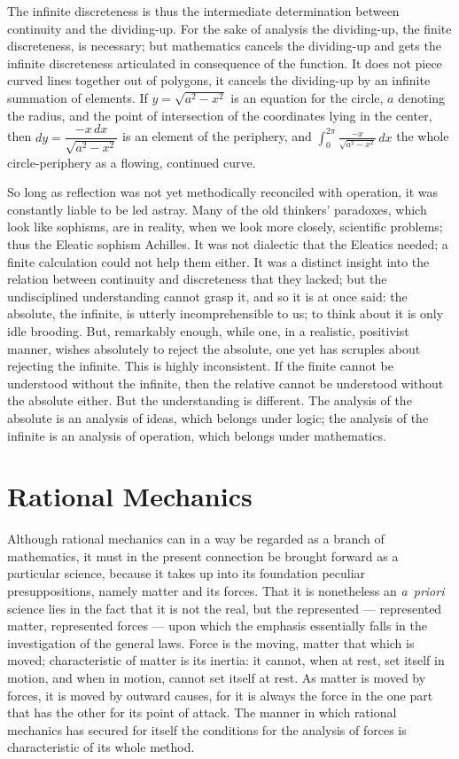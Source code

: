 \documentclass[12pt]{book}
\begin{document}
The infinite discreteness is thus the intermediate determination between continuity and
the dividing-up. For the sake of analysis the dividing-up, the finite discreteness, is
necessary; but mathematics cancels the dividing-up and gets the infinite discreteness
articulated in consequence of the function. It does not piece curved lines together out
of polygons, it cancels the dividing-up by an infinite summation of elements. If $y =
\sqrt{a^2 - x^2}$ is an equation for the circle, $a$ denoting the radius, and the point
of intersection of the coordinates lying in the center, then $dy = \dfrac{-x\,dx}{\sqrt{a^2
- x^2}}$ is an element of the periphery, and $\displaystyle\int_0^{2\pi} \frac{-x}{\sqrt{a^2
- x^2}}\,dx$ the whole circle-periphery as a flowing, continued curve.

So long as reflection was not yet methodically reconciled with operation, it was
constantly liable to be led astray. Many of the old thinkers' paradoxes, which look like
sophisms, are in reality, when we look more closely, scientific problems; thus the Eleatic
sophism Achilles. It was not dialectic that the Eleatics needed; a finite calculation could
not help them either. It was a distinct insight into the relation between continuity and
discreteness that they lacked; but the undisciplined understanding cannot grasp it, and so
it is at once said: the absolute, the infinite, is utterly incomprehensible to us; to think
about it is only idle brooding. But, remarkably enough, while one, in a realistic,
positivist manner, wishes absolutely to reject the absolute, one yet has scruples about
rejecting the infinite. This is highly inconsistent. If the finite cannot be understood
without the infinite, then the relative cannot be understood without the absolute either.
But the understanding is different. The analysis of the absolute is an analysis of ideas,
which belongs under logic; the analysis of the infinite is an analysis of operation, which
belongs under mathematics.

\section{Rational Mechanics}
\label{sec:13}

\noindent Although rational mechanics can in a way be regarded as a branch of
mathematics, it must in the present connection be brought forward as a particular
science, because it takes up into its foundation peculiar presuppositions, namely
matter and its forces. That it is nonetheless an \textit{a~priori} science lies in
the fact that it is not the real, but the represented --- represented matter,
represented forces --- upon which the emphasis essentially falls in the
investigation of the general laws. Force is the moving, matter that which is
moved; characteristic of matter is its inertia: it cannot, when at rest, set
itself in motion, and when in motion, cannot set itself at rest. As matter is
moved by forces, it is moved by outward causes, for it is always the force in the
one part that has the other for its point of attack. The manner in which rational
mechanics has secured for itself the conditions for the analysis of forces is
characteristic of its whole method.
\end{document}
